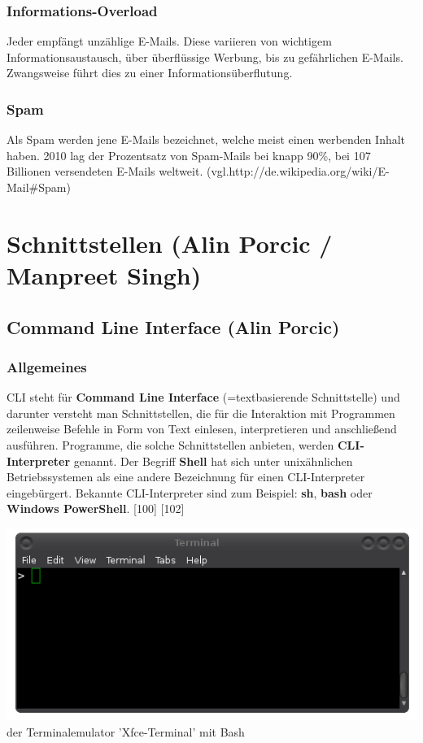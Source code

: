 \documentclass[12pt,a4paper]{report}
\begin{document}
\begin{onehalfspace}
\subsection{Informations-Overload}
Jeder empfängt unzählige E-Mails. Diese variieren von wichtigem Informationsaustausch, über überflüssige Werbung, bis zu gefährlichen E-Mails. Zwangsweise führt dies zu einer Informationsüberflutung. 
\subsection{Spam}\label{sssec:Spam}
Als Spam werden jene E-Mails bezeichnet, welche meist einen werbenden Inhalt haben. 2010 lag der Prozentsatz von Spam-Mails bei knapp 90\%, bei 107 Billionen versendeten E-Mails weltweit.  (vgl.http://de.wikipedia.org/wiki/E-Mail\#Spam) 
\chapter{Schnittstellen (Alin Porcic / Manpreet Singh)}

\section{Command Line Interface (Alin Porcic)}
\subsection{Allgemeines}

CLI steht für \textbf{Command Line Interface} (=textbasierende Schnittstelle) und darunter versteht man Schnittstellen, die für die Interaktion mit Programmen zeilenweise Befehle in Form von Text einlesen, interpretieren und anschließend ausführen. Programme, die solche Schnittstellen anbieten, werden \textbf{CLI-Interpreter} genannt. Der Begriff \textbf{Shell} hat sich unter unixähnlichen Betriebssystemen als eine andere Bezeichnung für einen CLI-Interpreter eingebürgert. Bekannte CLI-Interpreter sind zum Beispiel: \textbf{sh}, \textbf{bash} oder \textbf{Windows PowerShell}. [100] [102]

\begin{center}
\includegraphics[scale=0.5]{img/cli_pic.png}\\
der Terminalemulator 'Xfce-Terminal' mit Bash
\end{center}


\end{onehalfspace}
\end{document}

